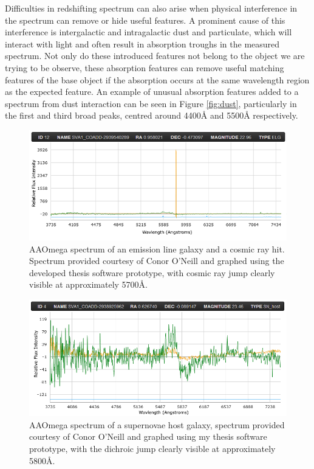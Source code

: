 \documentclass[titlesmallcaps, examinerscopy, copyrightpage]{uqthesis}
\begin{document}
Difficulties in redshifting spectrum can also arise when physical interference in the spectrum can remove or hide useful features. A prominent cause of this interference is intergalactic and intragalactic dust and particulate, which will interact with light and often result in absorption troughs in the measured spectrum. Not only do these introduced features not belong to the object we are trying to be observe, these absorption features can remove useful matching features of the base object if the absorption occurs at the same wavelength region as the expected feature. An example of unusual absorption features added to a spectrum from dust interaction can be seen in Figure \ref{fig:dust}, particularly in the first and third broad peaks, centred around 4400{\AA} and 5500{\AA} respectively.




\begin{figure}[ht!]
\includegraphics[width=1\textwidth]{images/CosmicRay.PNG} 
\centering
\caption{AAOmega spectrum of an emission line galaxy and a cosmic ray hit. Spectrum provided courtesy of Conor O'Neill and graphed using the developed thesis software prototype, with cosmic ray jump clearly visible at approximately 5700{\AA}.}
\label{fig:cosmic}
\end{figure}

\begin{figure}[ht!]
\includegraphics[width=1\textwidth]{images/jump.PNG} 
\centering
\caption{AAOmega spectrum of a supernovae host galaxy, spectrum provided courtesy of Conor O'Neill and graphed using my thesis software prototype, with the dichroic jump clearly visible at approximately 5800{\AA}.}
\label{fig:jump}
\end{figure}
\end{document}

